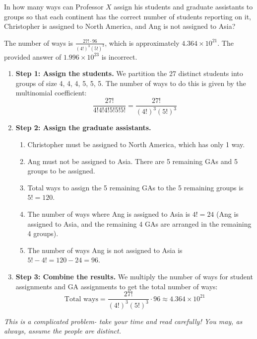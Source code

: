 \documentclass{article}
\begin{document}
\begin{enumerate}
  In how many ways can Professor $X$ assign his students and graduate assistants to groups so that each continent has the correct number of students reporting on it, Christopher is assigned to North America, and Ang is not assigned to Asia?
  \begin{answer}
    The number of ways is $\frac{27! \cdot 96}{(4!)^3 (5!)^3}$, which is approximately $4.364 \times 10^{21}$. The provided answer of $1.996 \times 10^{23}$ is incorrect.
    \begin{enumerate}
      \item \textbf{Step 1: Assign the students.} We partition the 27 distinct students into groups of size 4, 4, 4, 5, 5, 5. The number of ways to do this is given by the multinomial coefficient:
      $$
      \frac{27!}{4! 4! 4! 5! 5! 5!} = \frac{27!}{(4!)^3 (5!)^3}
      $$
      \item \textbf{Step 2: Assign the graduate assistants.}
      \begin{enumerate}
        \item Christopher must be assigned to North America, which has only 1 way.
        \item Ang must not be assigned to Asia. There are 5 remaining GAs and 5 groups to be assigned.
        \item Total ways to assign the 5 remaining GAs to the 5 remaining groups is $5! = 120$.
        \item The number of ways where Ang is assigned to Asia is $4! = 24$ (Ang is assigned to Asia, and the remaining 4 GAs are arranged in the remaining 4 groups).
        \item The number of ways Ang is not assigned to Asia is $5! - 4! = 120 - 24 = 96$.
      \end{enumerate}
      \item \textbf{Step 3: Combine the results.} We multiply the number of ways for student assignments and GA assignments to get the total number of ways:
      $$
      \text{Total ways} = \frac{27!}{(4!)^3 (5!)^3} \cdot 96 \approx 4.364 \times 10^{21}
      $$
    \end{enumerate}
  \end{answer}
\end{enumerate}

\textit{This is a complicated problem- take your time and read carefully! You may, as always, assume the people are distinct.}
\end{document}
